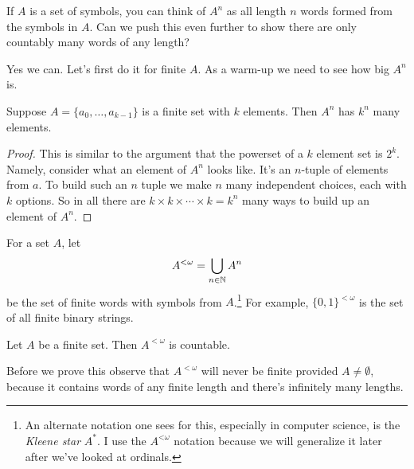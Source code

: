 \documentclass[10pt]{amsart}
\begin{document}
If $A$ is a set of symbols, you can think of $A^n$ as all length $n$ words formed from the symbols in $A$. Can we push this even further to show there are only countably many words of any length? 

Yes we can. Let's first do it for finite $A$. As a warm-up we need to see how big $A^n$ is.

\begin{lemma}
Suppose $A = \{a_0, \ldots, a_{k-1}\}$ is a finite set with $k$ elements. Then $A^n$ has $k^n$ many elements. 
\end{lemma}

\begin{proof}
This is similar to the argument that the powerset of a $k$ element set is $2^k$. Namely, consider what an element of $A^n$ looks like. It's an $n$-tuple of elements from $a$. To build such an $n$ tuple we make $n$ many independent choices, each with $k$ options. So in all there are $k \times k \times \cdots \times k  = k^n$ many ways to build up an element of $A^n$.
\end{proof}

For a set $A$, let 
\[
A^{<\omega} = \bigcup_{n \in \mathbb{N}} A^n
\]
be the set of finite words with symbols from $A$.\footnote{An alternate notation one sees for this, especially in computer science, is the \emph{Kleene star} $A^*$. I use the $A^{\mathbin<\omega}$ notation because we will generalize it later after we've looked at ordinals.}
For example, $\{0,1\}^{<\omega}$ is the set of all finite binary strings.

\begin{proposition}
Let $A$ be a finite set. Then $A^{<\omega}$ is countable.
\end{proposition}

Before we prove this observe that $A^{<\omega}$ will never be finite provided $A \ne \emptyset$, because it contains words of any finite length and there's infinitely many lengths.
\end{document}
